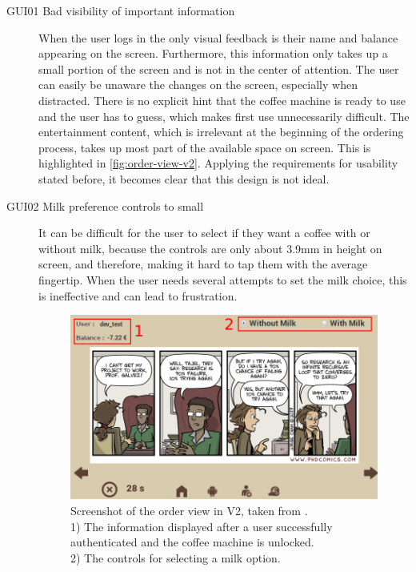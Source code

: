 \documentclass[12pt]{article}
\begin{document}
\begin{description}
\item [GUI01 Bad visibility of important information]
\label{pa:GUI01}
When the user logs in the only visual feedback is their name and balance appearing on the screen.
Furthermore, this information only takes up a small portion of the screen and is not in the center of attention.
The user can easily be unaware the changes on the screen, especially when distracted.
There is no explicit hint that the coffee machine is ready to use and the user has to guess, which makes first use unnecessarily difficult.
The entertainment content, which is irrelevant at the beginning of the ordering process, takes up most part of the available space on screen.
This is highlighted in \autoref{fig:order-view-v2}.
Applying the requirements for usability stated before, it becomes clear that this design is not ideal.

\item [GUI02 Milk preference controls to small]
\label{pa:GUI02}
It can be difficult for the user to select if they want a coffee with or without milk,
because the controls are only about 3.9mm in height on screen, and therefore, making it hard to tap them with the average fingertip.
When the user needs several attempts to set the milk choice, this is ineffective and can lead to frustration.

\begin{figure}[h]
  \centering
  \includegraphics[width=\textwidth]{./images/order-page-v2.png}
  \caption[Screenshot of the order view in V2.]
  {Screenshot of the order view in V2, taken from \cite{Thesis2}. \\
  1) The information displayed after a user successfully authenticated and the coffee machine is unlocked.\\
  2) The controls for selecting a milk option.}
  \label{fig:order-view-v2}
\end{figure}


\end{description}
\end{document}

